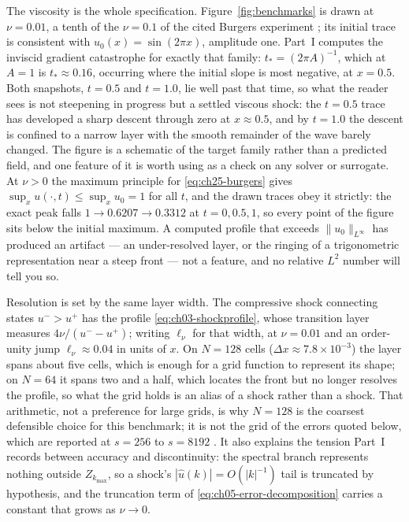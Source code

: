 The viscosity is the whole specification. Figure~\ref{fig:benchmarks}
is drawn at $\nu = 0.01$, a tenth of the $\nu = 0.1$ of the cited Burgers
experiment \cite{li2021fourier}; its initial trace is consistent with
$u_0(x) = \sin(2\pi x)$, amplitude one. Part~I computes the inviscid gradient
catastrophe for exactly that family: $t_{*} = (2\pi A)^{-1}$, which at $A = 1$ is
$t_{*} \approx 0.16$, occurring where the initial slope is most negative, at
$x = 0.5$. Both snapshots, $t = 0.5$ and $t = 1.0$, lie well past
that time, so what the reader sees is not steepening in progress but a settled
viscous shock: the $t = 0.5$ trace has developed a sharp descent through zero at
$x \approx 0.5$, and by $t = 1.0$ the descent is confined to a narrow layer with
the smooth remainder of the wave barely changed. The figure is a schematic of the
target family rather than a predicted field, and one feature of it is worth using
as a check on any solver or surrogate. At $\nu > 0$ the maximum principle for
\eqref{eq:ch25-burgers} gives $\sup_x u(\cdot, t) \le \sup_x u_0 = 1$ for all $t$,
and the drawn traces obey it strictly: the exact peak falls $1 \to 0.6207 \to
0.3312$ at $t = 0, 0.5, 1$, so every point of the figure sits below the initial
maximum. A computed profile that exceeds $\|u_0\|_{L^{\infty}}$ has produced an
artifact --- an under-resolved layer, or the ringing of a trigonometric
representation near a steep front --- not a feature, and no relative $L^{2}$
number will tell you so.

Resolution is set by the same layer width. The compressive shock connecting states
$u^{-} > u^{+}$ has the profile \eqref{eq:ch03-shockprofile}, whose transition
layer measures $4\nu/(u^{-} - u^{+})$; writing $\ell_{\nu}$ for that width, at
$\nu = 0.01$ and an order-unity jump $\ell_{\nu} \approx 0.04$ in units of $x$. On
$N = 128$ cells ($\Delta x \approx 7.8 \times 10^{-3}$) the layer spans about five
cells, which is enough for a grid function to represent its shape; on $N = 64$ it
spans two and a
half, which locates the front but no longer resolves the profile, so what the grid
holds is an alias of a shock rather than a shock. That arithmetic, not
a preference for large grids, is why $N = 128$ is the coarsest defensible choice for
this benchmark; it is not the grid of the errors quoted below, which are reported
at $s = 256$ to $s = 8192$ \cite{li2021fourier}. It
also explains the tension Part~I records between accuracy and discontinuity: the
spectral branch represents nothing outside $Z_{k_{\max}}$, so a shock's
$|\hat{u}(k)| = O(|k|^{-1})$ tail is truncated by hypothesis, and the truncation
term of \eqref{eq:ch05-error-decomposition} carries a constant that grows as
$\nu \to 0$.


